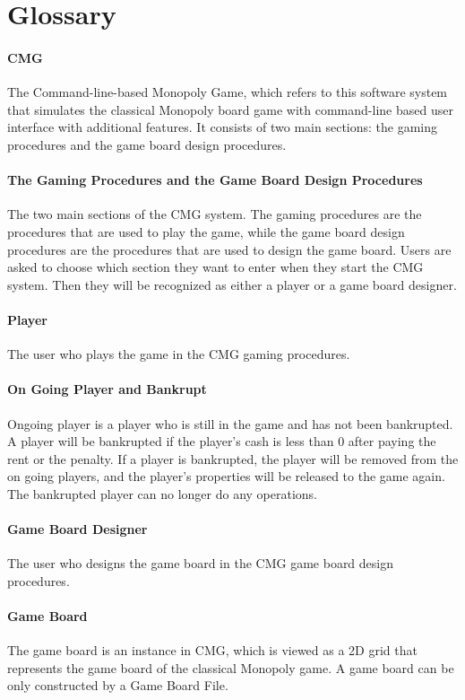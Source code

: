 \documentclass{article}
\begin{document}
\section{Glossary}

\paragraph{CMG} The Command-line-based Monopoly Game, which refers to this software system that simulates the classical Monopoly board game with command-line based user interface with additional features.
It consists of two main sections: the gaming procedures and the game board design procedures.

\paragraph{The Gaming Procedures and the Game Board Design Procedures} The two main sections of the CMG system. The gaming procedures are the procedures that are used to play the game, while the game board design procedures are the procedures that are used to design the game board.
Users are asked to choose which section they want to enter when they start the CMG system. Then they will be recognized as either a player or a game board designer.

\paragraph{Player} The user who plays the game in the CMG gaming procedures.

\paragraph{On Going Player and Bankrupt} Ongoing player is a player who is still in the game and has not been bankrupted. A player will be bankrupted if the player's cash is less than 0 after paying the rent or the penalty.
If a player is bankrupted, the player will be removed from the on going players, and the player's properties will be released to the game again. The bankrupted player can no longer do any operations.

\paragraph{Game Board Designer} The user who designs the game board in the CMG game board design procedures.

\paragraph{Game Board} The game board is an instance in CMG, which is viewed as a 2D grid that represents the game board of the classical Monopoly game. 
A game board can be only constructed by a Game Board File.
\end{document}
